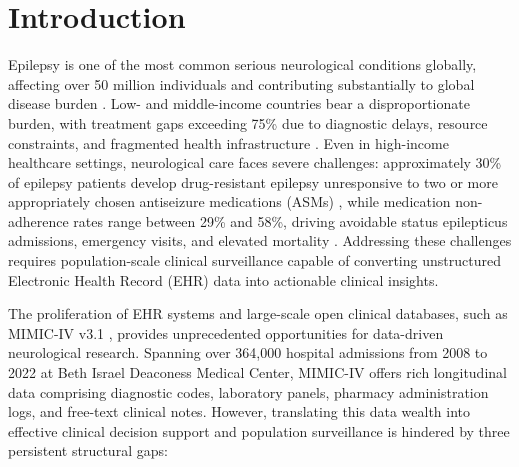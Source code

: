 \documentclass[11pt,a4paper]{article}
\begin{document}
\clearpage

\section{Introduction}

Epilepsy is one of the most common serious neurological conditions globally, affecting over 50 million individuals and contributing substantially to global disease burden \cite{who2019epilepsy, fisher2014ilae}. Low- and middle-income countries bear a disproportionate burden, with treatment gaps exceeding 75\% due to diagnostic delays, resource constraints, and fragmented health infrastructure \cite{who2019epilepsy}. Even in high-income healthcare settings, neurological care faces severe challenges: approximately 30\% of epilepsy patients develop drug-resistant epilepsy unresponsive to two or more appropriately chosen antiseizure medications (ASMs) \cite{kwan2000early, kwan2011definition}, while medication non-adherence rates range between 29\% and 58\%, driving avoidable status epilepticus admissions, emergency visits, and elevated mortality \cite{hovinga2008association}. Addressing these challenges requires population-scale clinical surveillance capable of converting unstructured Electronic Health Record (EHR) data into actionable clinical insights.

The proliferation of EHR systems and large-scale open clinical databases, such as MIMIC-IV v3.1 \cite{johnson2024mimic}, provides unprecedented opportunities for data-driven neurological research. Spanning over 364,000 hospital admissions from 2008 to 2022 at Beth Israel Deaconess Medical Center, MIMIC-IV offers rich longitudinal data comprising diagnostic codes, laboratory panels, pharmacy administration logs, and free-text clinical notes. However, translating this data wealth into effective clinical decision support and population surveillance is hindered by three persistent structural gaps:
\end{document}
